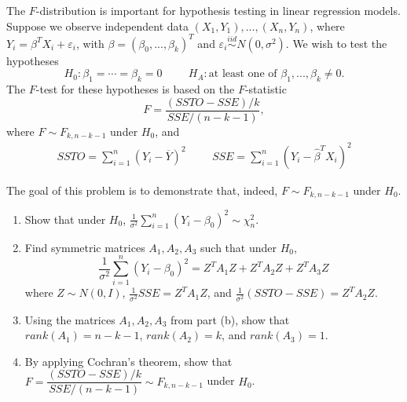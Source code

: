 \documentclass[11pt]{article}
\begin{document}
\begin{enumerate}
The $F$-distribution is important for hypothesis testing in linear regression models. Suppose we observe independent data $(X_1, Y_1),...,(X_n, Y_n)$, where $Y_i = \beta^T X_i + \varepsilon_i$, with $\beta = (\beta_0, ..., \beta_k)^T$ and $\varepsilon_i \overset{iid}{\sim} N(0, \sigma^2)$. We wish to test the hypotheses
$$H_0: \beta_1 = \cdots = \beta_k = 0 \hspace{1cm} H_A: \text{at least one of } \beta_1,...,\beta_k \neq 0.$$
The $F$-test for these hypotheses is based on the $F$-statistic
$$F = \dfrac{(SSTO - SSE)/k}{SSE/(n - k - 1)},$$
where $F \sim F_{k, n-k-1}$ under $H_0$, and
\begin{align*}
SSTO = \sum \limits_{i=1}^n (Y_i - \overline{Y})^2 \hspace{1cm} SSE = \sum \limits_{i=1}^n (Y_i - \widehat{\beta}^T X_i)^2
\end{align*}

The goal of this problem is to demonstrate that, indeed, $F \sim F_{k, n-k-1}$ under $H_0$.

\begin{enumerate}
\item Show that under $H_0$, $\frac{1}{\sigma^2}\sum \limits_{i=1}^n (Y_i - \beta_0)^2 \sim \chi^2_n$.

\item Find symmetric matrices $A_1, A_2, A_3$ such that under $H_0$, 
$$\frac{1}{\sigma^2}\sum \limits_{i=1}^n (Y_i - \beta_0)^2 = Z^T A_1 Z + Z^T A_2 Z + Z^T A_3 Z$$
where $Z \sim N(0, I)$, $\frac{1}{\sigma^2} SSE = Z^T A_1 Z$, and $\frac{1}{\sigma^2} (SSTO - SSE) = Z^T A_2 Z$.

\item Using the matrices $A_1, A_2, A_3$ from part (b), show that $rank(A_1) = n-k-1$, $rank(A_2) = k$, and $rank(A_3) = 1$.

\item By applying Cochran's theorem, show that $F = \dfrac{(SSTO - SSE)/k}{SSE/(n - k - 1)} \sim F_{k, n-k-1}$ under $H_0$.
\end{enumerate}
\end{enumerate}
\end{document}
